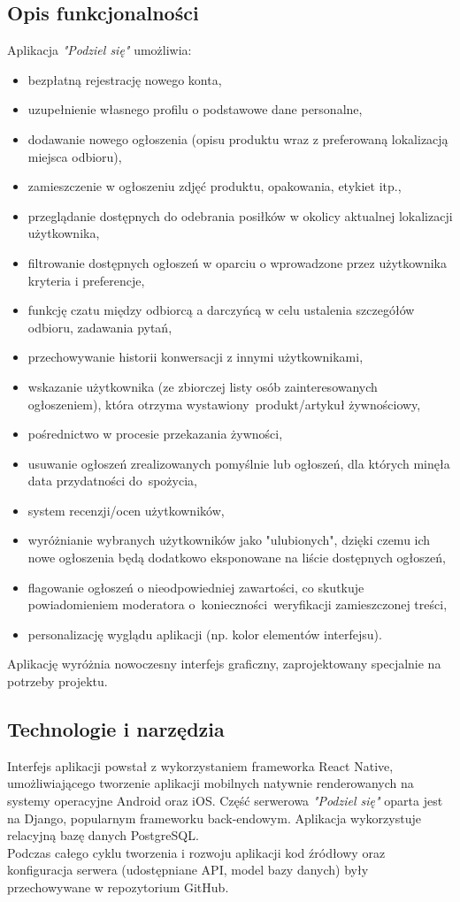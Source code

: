 \documentclass[11pt]{article}
\begin{document}
\subsection*{Opis funkcjonalności}
Aplikacja \textit{"Podziel się"} umożliwia:
\begin{itemize}
\setlength\itemsep{-0.2em}
\item bezpłatną rejestrację nowego konta,
\item uzupełnienie własnego profilu o podstawowe dane personalne,
\item dodawanie nowego ogłoszenia (opisu produktu wraz z preferowaną lokalizacją miejsca odbioru),
\item zamieszczenie w ogłoszeniu zdjęć produktu, opakowania, etykiet itp.,
\item przeglądanie dostępnych do odebrania posiłków w okolicy aktualnej lokalizacji użytkownika,
\item filtrowanie dostępnych ogłoszeń w oparciu o wprowadzone przez użytkownika kryteria i preferencje,
\item funkcję czatu między odbiorcą a darczyńcą w celu ustalenia szczegółów odbioru, zadawania pytań,
\item przechowywanie historii konwersacji z innymi użytkownikami,
\item wskazanie użytkownika (ze zbiorczej listy osób zainteresowanych ogłoszeniem), która otrzyma wystawiony~produkt/artykuł żywnościowy,
\item pośrednictwo w procesie przekazania żywności,
\item usuwanie ogłoszeń zrealizowanych pomyślnie lub ogłoszeń, dla których minęła data przydatności do~spożycia,
\item system recenzji/ocen użytkowników,
\item wyróżnianie wybranych użytkowników jako "ulubionych", dzięki czemu ich nowe ogłoszenia będą dodatkowo eksponowane na liście dostępnych ogłoszeń,
\item flagowanie ogłoszeń o nieodpowiedniej zawartości, co skutkuje powiadomieniem moderatora o~konieczności~weryfikacji zamieszczonej treści,
\item personalizację wyglądu aplikacji (np. kolor elementów interfejsu).
\end{itemize}
Aplikację wyróżnia nowoczesny interfejs graficzny, zaprojektowany specjalnie na potrzeby projektu.

\subsection*{Technologie i narzędzia}
Interfejs aplikacji powstał z wykorzystaniem frameworka React Native, umożliwiającego tworzenie aplikacji mobilnych natywnie renderowanych na systemy operacyjne Android oraz iOS. Część serwerowa \textit{"Podziel się"} oparta jest na Django, popularnym frameworku back-endowym. Aplikacja wykorzystuje relacyjną bazę danych PostgreSQL.
\vspace{2mm}\\
Podczas całego cyklu tworzenia i rozwoju aplikacji kod źródłowy oraz konfiguracja serwera (udostępniane API, model bazy danych) były przechowywane w repozytorium GitHub.
\end{document}
